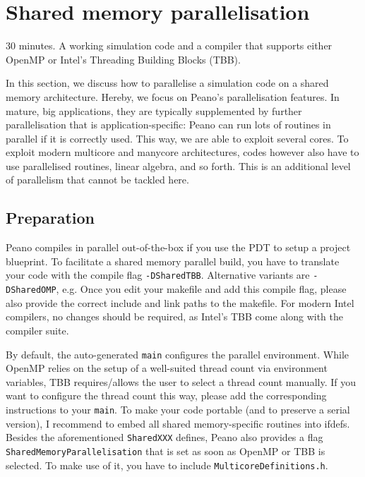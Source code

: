 \section{Shared memory parallelisation}
  \label{section:parallelisation:shared-memory}


\chapterDescription
  {
    30 minutes.
  }
  {
    A working simulation code and a compiler that supports either OpenMP or
    Intel's Threading Building Blocks (TBB).
  }

In this section, we discuss how to parallelise a simulation code on a shared
memory architecture.
Hereby, we focus on Peano's parallelisation features. 
In mature, big applications, they are typically supplemented by further
parallelisation that is application-specific: Peano can run lots of routines in
parallel if it is correctly used. 
This way, we are able to exploit several cores.
To exploit modern multicore and manycore architectures, codes however also have
to use parallelised routines, linear algebra, and so forth.
This is an additional level of parallelism that cannot be tackled here.

\subsection{Preparation}
\label{section:shared-memory:preparation}

Peano compiles in parallel out-of-the-box if you use the PDT to setup a project
blueprint. 
To facilitate a shared memory parallel build, you have to translate your code
with the compile flag \texttt{-DSharedTBB}. 
Alternative variants are \texttt{-DSharedOMP}, e.g.
Once you edit your makefile and add this compile flag, please also provide the
correct include and link paths to the makefile.
For modern Intel compilers, no changes should be required, as Intel's TBB come
along with the compiler suite.

By default, the auto-generated \texttt{main} configures the parallel environment. 
While OpenMP relies on the setup of a well-suited thread count via environment
variables, TBB requires/allows the user to select a thread count manually. 
If you want to configure the thread count this way, please add the corresponding
instructions to your \texttt{main}.
To make your code portable (and to preserve a serial version), I recommend to
embed all shared memory-specific routines into ifdefs.
Besides the aforementioned \texttt{SharedXXX} defines, Peano also provides a
flag \texttt{SharedMemoryParallelisation} that is set as soon as OpenMP or TBB
is selected.
To make use of it, you have to include
\linebreak \texttt{MulticoreDefinitions.h}.

